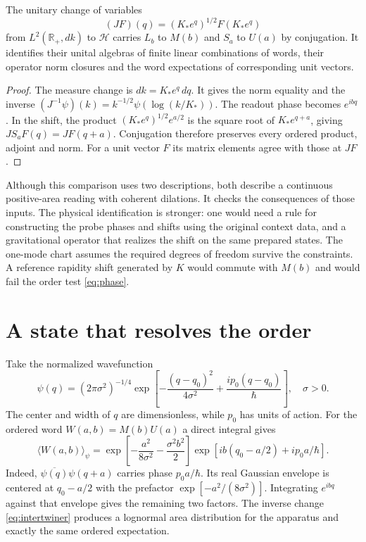 \documentclass[11pt,letterpaper]{article}
\begin{document}
\begin{proposition}
The unitary change of variables
\begin{equation}
 (JF)(q)=(K_* e^q)^{1/2}F(K_*e^q)
 \label{eq:intertwiner}
\end{equation}
from $L^2(\mathbb R_+,dk)$ to $\mathcal H$ carries $L_b$ to $M(b)$ and $S_a$ to $U(a)$ by conjugation. It identifies their unital algebras of finite linear combinations of words, their operator norm closures and the word expectations of corresponding unit vectors.
\end{proposition}
\begin{proof}
The measure change is $dk=K_*e^q\,dq$. It gives the norm equality and the inverse $(J^{-1}\psi)(k)=k^{-1/2}\psi(\log(k/K_*))$. The readout phase becomes $e^{ibq}$. In the shift, the product $(K_*e^q)^{1/2}e^{a/2}$ is the square root of $K_*e^{q+a}$, giving $JS_aF(q)=JF(q+a)$. Conjugation therefore preserves every ordered product, adjoint and norm. For a unit vector $F$ its matrix elements agree with those at $JF$.
\end{proof}

Although this comparison uses two descriptions, both describe a continuous positive-area reading with coherent dilations. It checks the consequences of those inputs. The physical identification is stronger: one would need a rule for constructing the probe phases and shifts using the original context data, and a gravitational operator that realizes the shift on the same prepared states. The one-mode chart assumes the required degrees of freedom survive the constraints. A reference rapidity shift generated by $K$ would commute with $M(b)$ and would fail the order test \eqref{eq:phase}.

\section{A state that resolves the order}

Take the normalized wavefunction
\begin{equation}
 \psi(q)=(2\pi\sigma^2)^{-1/4}
   \exp\left[-\frac{(q-q_0)^2}{4\sigma^2}
          +\frac{i p_0(q-q_0)}{\hbar}\right],
 \quad \sigma>0 .                                     \label{eq:state}
\end{equation}
The center and width of $q$ are dimensionless, while $p_0$ has units of action. For the ordered word $W(a,b)=M(b)U(a)$ a direct integral gives
\begin{equation}
 \langle W(a,b)\rangle_\psi
 =\exp\left[-\frac{a^2}{8\sigma^2}-\frac{\sigma^2 b^2}{2}\right]
  \exp\left[i b(q_0-a/2)+ i p_0a/\hbar\right].          \label{eq:gaussian}
\end{equation}
Indeed, $\overline{\psi(q)}\psi(q+a)$ carries phase $p_0a/\hbar$. Its real Gaussian envelope is centered at $q_0-a/2$ with the prefactor $\exp[-a^2/(8\sigma^2)]$. Integrating $e^{ibq}$ against that envelope gives the remaining two factors. The inverse change \eqref{eq:intertwiner} produces a lognormal area distribution for the apparatus and exactly the same ordered expectation.
\end{document}

